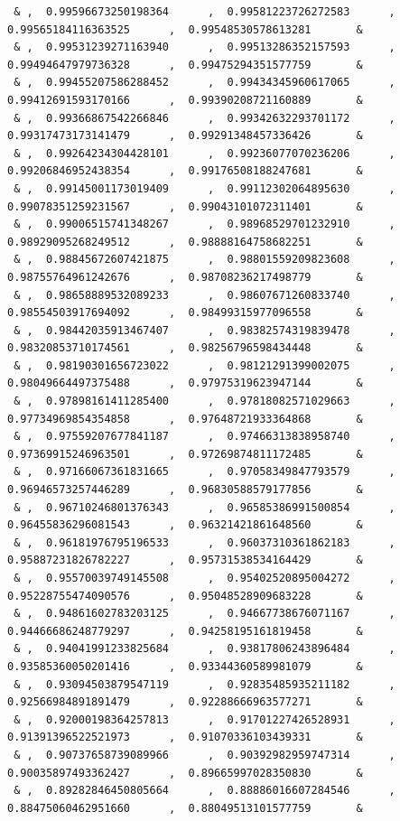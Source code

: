 \documentclass[a4paper,10pt]{report}
\begin{document}
{\begin{verbatim}
 & ,  0.99596673250198364      ,  0.99581223726272583      ,  0.99565184116363525      ,  0.99548530578613281       &
 & ,  0.99531239271163940      ,  0.99513286352157593      ,  0.99494647979736328      ,  0.99475294351577759       &
 & ,  0.99455207586288452      ,  0.99434345960617065      ,  0.99412691593170166      ,  0.99390208721160889       &
 & ,  0.99366867542266846      ,  0.99342632293701172      ,  0.99317473173141479      ,  0.99291348457336426       &
 & ,  0.99264234304428101      ,  0.99236077070236206      ,  0.99206846952438354      ,  0.99176508188247681       &
 & ,  0.99145001173019409      ,  0.99112302064895630      ,  0.99078351259231567      ,  0.99043101072311401       &
 & ,  0.99006515741348267      ,  0.98968529701232910      ,  0.98929095268249512      ,  0.98888164758682251       &
 & ,  0.98845672607421875      ,  0.98801559209823608      ,  0.98755764961242676      ,  0.98708236217498779       &
 & ,  0.98658889532089233      ,  0.98607671260833740      ,  0.98554503917694092      ,  0.98499315977096558       &
 & ,  0.98442035913467407      ,  0.98382574319839478      ,  0.98320853710174561      ,  0.98256796598434448       &
 & ,  0.98190301656723022      ,  0.98121291399002075      ,  0.98049664497375488      ,  0.97975319623947144       &
 & ,  0.97898161411285400      ,  0.97818082571029663      ,  0.97734969854354858      ,  0.97648721933364868       &
 & ,  0.97559207677841187      ,  0.97466313838958740      ,  0.97369915246963501      ,  0.97269874811172485       &
 & ,  0.97166067361831665      ,  0.97058349847793579      ,  0.96946573257446289      ,  0.96830588579177856       &
 & ,  0.96710246801376343      ,  0.96585386991500854      ,  0.96455836296081543      ,  0.96321421861648560       &
 & ,  0.96181976795196533      ,  0.96037310361862183      ,  0.95887231826782227      ,  0.95731538534164429       &
 & ,  0.95570039749145508      ,  0.95402520895004272      ,  0.95228755474090576      ,  0.95048528909683228       &
 & ,  0.94861602783203125      ,  0.94667738676071167      ,  0.94466686248779297      ,  0.94258195161819458       &
 & ,  0.94041991233825684      ,  0.93817806243896484      ,  0.93585360050201416      ,  0.93344360589981079       &
 & ,  0.93094503879547119      ,  0.92835485935211182      ,  0.92566984891891479      ,  0.92288666963577271       &
 & ,  0.92000198364257813      ,  0.91701227426528931      ,  0.91391396522521973      ,  0.91070336103439331       &
 & ,  0.90737658739089966      ,  0.90392982959747314      ,  0.90035897493362427      ,  0.89665997028350830       &
 & ,  0.89282846450805664      ,  0.88886016607284546      ,  0.88475060462951660      ,  0.88049513101577759       &

\end{verbatim}}
\end{document}
